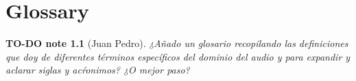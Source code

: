 \documentclass{book}
\def\startappendix{
  \appendix
  \appendixpage
  \addappheadtotoc
}
\newtheorem{todo}{TO-DO note}
\begin{document}



\frontmatter
\tableofcontents
\listoffigures
\listoftables
\mainmatter

\setlength{\parskip}{5pt}








\startappendix

\chapter{Glossary}
\begin{todo}[Juan Pedro]
¿Añado un glosario recopilando las definiciones que doy de diferentes
términos específicos del dominio del audio y para expandir y aclarar
siglas y acŕonimos? ¿O mejor paso?
\end{todo}


\end{document}
